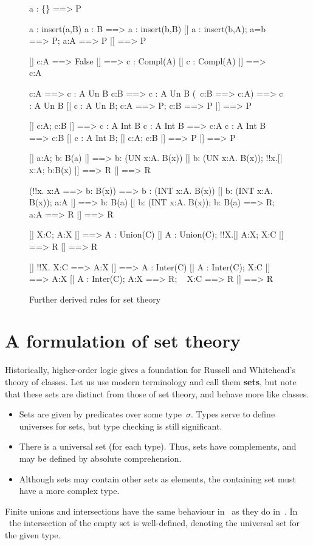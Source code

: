 \begin{figure} \underscoreon
\begin{ttbox}
   a : \{\} ==> P

 a : insert(a,B)
 a : B ==> a : insert(b,B)
  [| a : insert(b,A);  a=b ==> P;  a:A ==> P |] ==> P

   [| c:A ==> False |] ==> c : Compl(A)
   [| c : Compl(A) |] ==> ~ c:A

     c:A ==> c : A Un B
     c:B ==> c : A Un B
     (~c:B ==> c:A) ==> c : A Un B
      [| c : A Un B;  c:A ==> P;  c:B ==> P |] ==> P

     [| c:A;  c:B |] ==> c : A Int B
    c : A Int B ==> c:A
    c : A Int B ==> c:B
     [| c : A Int B;  [| c:A; c:B |] ==> P |] ==> P

     [| a:A;  b: B(a) |] ==> b: (UN x:A. B(x))
     [| b: (UN x:A. B(x));  !!x.[| x:A;  b:B(x) |] ==> R |] ==> R

    (!!x. x:A ==> b: B(x)) ==> b : (INT x:A. B(x))
    [| b: (INT x:A. B(x));  a:A |] ==> b: B(a)
    [| b: (INT x:A. B(x));  b: B(a) ==> R;  ~ a:A ==> R |] ==> R

   [| X:C;  A:X |] ==> A : Union(C)
   [| A : Union(C);  !!X.[| A:X;  X:C |] ==> R |] ==> R

   [| !!X. X:C ==> A:X |] ==> A : Inter(C)
   [| A : Inter(C);  X:C |] ==> A:X
   [| A : Inter(C);  A:X ==> R;  ~ X:C ==> R |] ==> R
\end{ttbox}
\caption{Further derived rules for set theory} \label{hol-set2}
\end{figure}


\section{A formulation of set theory}
Historically, higher-order logic gives a foundation for Russell and
Whitehead's theory of classes.  Let us use modern terminology and call them
{\bf sets}, but note that these sets are distinct from those of {\ZF} set
theory, and behave more like {\ZF} classes.
\begin{itemize}
\item
Sets are given by predicates over some type~$\sigma$.  Types serve to
define universes for sets, but type checking is still significant.
\item
There is a universal set (for each type).  Thus, sets have complements, and
may be defined by absolute comprehension.
\item
Although sets may contain other sets as elements, the containing set must
have a more complex type.
\end{itemize}
Finite unions and intersections have the same behaviour in \HOL\ as they
do in~{\ZF}.  In \HOL\ the intersection of the empty set is well-defined,
denoting the universal set for the given type.

